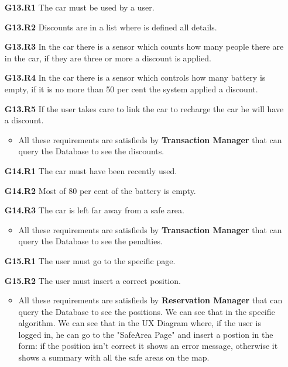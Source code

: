 \begin{itemize}
\item[\textbf{G13.R1}] The car must be used by a user.
\item[\textbf{G13.R2}] Discounts are in a list where is defined all details.
\item[\textbf{G13.R3}] In the car there is a sensor which counts how many people there are in the car, if they are three or more a discount is applied.
\item[\textbf{G13.R4}] In the car there is a sensor which controls how many battery is empty, if it is no more than 50 per cent the system applied a discount.
\item[\textbf{G13.R5}] If the user takes care to link the car to recharge the car he will have a discount.
\begin{itemize}
\item All these requirements are satisfieds by \textbf{Transaction Manager} that can query the Database to see the discounts.
\end{itemize}

\item[\textbf{G14.R1}] The car must have been recently used.
\item[\textbf{G14.R2}] Most of 80 per cent of the battery is empty.
\item[\textbf{G14.R3}] The car is left far away from a safe area.
\begin{itemize}
\item All these requirements are satisfieds by \textbf{Transaction Manager} that can query the Database to see the penalties.
\end{itemize}

\item[\textbf{G15.R1}] The user must go to the specific page.
\item[\textbf{G15.R2}] The user must insert a correct position.
\begin{itemize}
\item All these requirements are satisfieds by \textbf{Reservation Manager} that can query the Database to see the positions. We can see that in the specific algorithm. We can see that in the UX Diagram where, if the user is logged in, he can go to the "SafeArea Page" and insert a postion in the form: if the position isn't correct it shows an error message, otherwise it shows a summary with all the safe areas on the map.
\end{itemize} 


\end{itemize}
